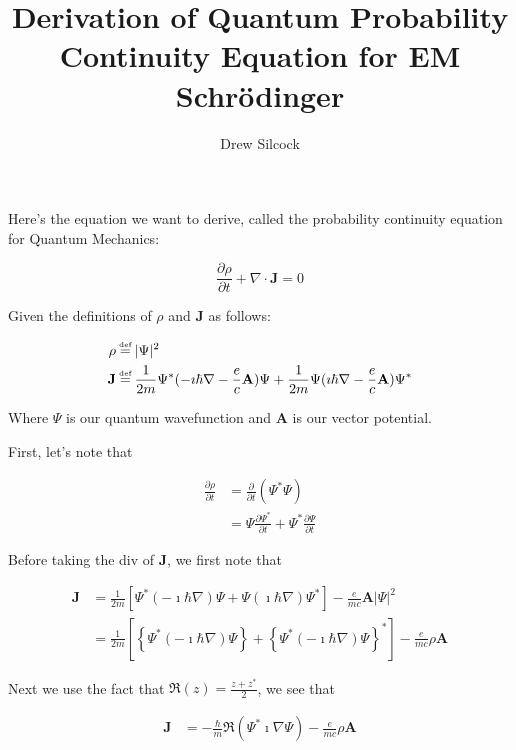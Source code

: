 \documentclass{article}
\title{Derivation of Quantum Probability Continuity Equation for EM Schr\"odinger}
\author{Drew Silcock}
\date{}
\begin{document}
\maketitle

Here's the equation we want to derive, called the probability continuity
equation for Quantum Mechanics:

\begin{equation}
    \frac{\partial \rho}{\partial t} + \nabla \cdot \mathbf{J} = 0
\end{equation}

Given the definitions of $\rho$ and $\mathbf{J}$ as follows:

\begin{align}
    \rho &\defeq | \Psi |^2 \\
    \mathbf{J} &\defeq \frac{1}{2m} \Psi^*(-\imath\hbar\nabla -
    \frac{e}{c}\mathbf{A})\Psi +
    \frac{1}{2m}\Psi(\imath\hbar\nabla-\frac{e}{c}\mathbf{A})\Psi^*
\end{align}

Where $\Psi$ is our quantum wavefunction and $\mathbf{A}$ is our vector
potential.

First, let's note that

\begin{align}
    \frac{\partial \rho}{\partial t} &= \frac{\partial}{\partial t} \left(
    \Psi^*\Psi \right) \\
    &= \Psi\frac{\partial \Psi^*}{\partial t} + \Psi^*\frac{\partial
    \Psi}{\partial t}
\end{align}

Before taking the div of $\mathbf{J}$, we first note that

\begin{align}
    \mathbf{J} &= \frac{1}{2m}\left[ \Psi^*\left(-\imath\hbar\nabla\right)\Psi +
    \Psi\left(\imath\hbar\nabla\right)\Psi^*\right] - \frac{e}{mc}\mathbf{A}|\Psi|^2
    \\
    &= \frac{1}{2m}\left[ \left\{ \Psi^*\left(-\imath\hbar\nabla\right)\Psi
    \right\} + \left\{ \Psi^*\left(-\imath\hbar\nabla\right)\Psi \right\}^* \right]
    - \frac{e}{mc}\rho\mathbf{A}
\end{align}

Next we use the fact that $\Re(z) = \frac{z + z^*}{2}$, we see that

\begin{align}
    \mathbf{J} &= -\frac{\hbar}{m}\Re(\Psi^*\imath\nabla\Psi) -
    \frac{e}{mc}\rho\mathbf{A}
\end{align}
\end{document}

